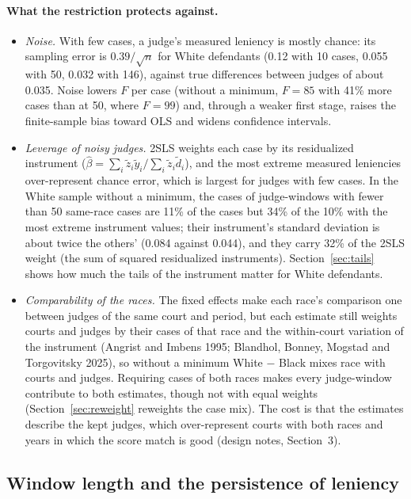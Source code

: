 \documentclass[11pt]{article}
\begin{document}
\paragraph{What the restriction protects against.}
\begin{itemize}
  \item \emph{Noise.} With few cases, a judge's measured leniency is mostly chance: its sampling error is $0.39/\sqrt{n}$ for White defendants (0.12 with 10 cases, 0.055 with 50, 0.032 with 146), against true differences between judges of about 0.035. Noise lowers $F$ per case (without a minimum, $F = 85$ with 41\% more cases than at 50, where $F = 99$) and, through a weaker first stage, raises the finite-sample bias toward OLS and widens confidence intervals.
  \item \emph{Leverage of noisy judges.} 2SLS weights each case by its residualized instrument ($\hat\beta = \sum_i \tilde z_i \tilde y_i / \sum_i \tilde z_i \tilde d_i$), and the most extreme measured leniencies over-represent chance error, which is largest for judges with few cases. In the White sample without a minimum, the cases of judge-windows with fewer than 50 same-race cases are 11\% of the cases but 34\% of the 10\% with the most extreme instrument values; their instrument's standard deviation is about twice the others' (0.084 against 0.044), and they carry 32\% of the 2SLS weight (the sum of squared residualized instruments). Section~\ref{sec:tails} shows how much the tails of the instrument matter for White defendants.
  \item \emph{Comparability of the races.} The fixed effects make each race's comparison one between judges of the same court and period, but each estimate still weights courts and judges by their cases of that race and the within-court variation of the instrument (Angrist and Imbens 1995; Blandhol, Bonney, Mogstad and Torgovitsky 2025), so without a minimum White $-$ Black mixes race with courts and judges. Requiring cases of both races makes every judge-window contribute to both estimates, though not with equal weights (Section~\ref{sec:reweight} reweights the case mix). The cost is that the estimates describe the kept judges, which over-represent courts with both races and years in which the score match is good (design notes, Section~3).
\end{itemize}

\subsection{Window length and the persistence of leniency}\label{sec:windows}
\end{document}
